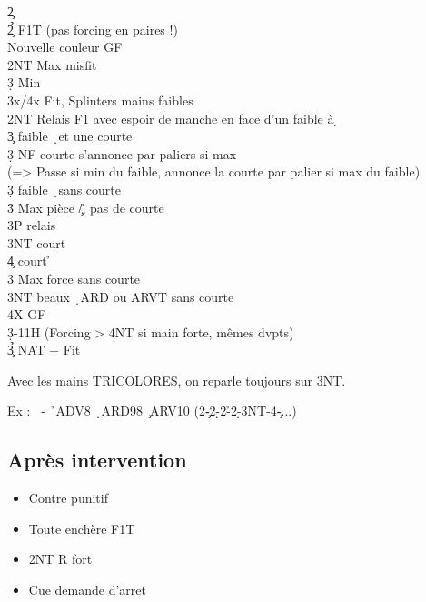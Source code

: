 \documentclass[a4paper]{article}
\begin{document}
\begin{bidtable}
2\c\+\\
2\h{}\c \> F1T (pas forcing en paires !)\\
\>Nouvelle couleur GF\+\\
2NT \> Max misfit\\
3\d \> Min\\
3x/4x \> Fit, Splinters mains faibles\-\\
2NT \> Relais F1 avec espoir de manche en face d’un faible à \d \+\\
3\c \> faible \d\ et une courte\+\\
3\d \> NF courte s’annonce par paliers si max\\
\>(=> Passe si min du faible, annonce la courte par palier si max du faible)\-\\
3\d \> faible \d\ sans courte\\
3\h \> Max pièce \c /\h , pas de courte\+\\
3P \> relais\+\\
3NT \> court \c \\
4\c \> court \h \-\-\\
3\s \> Max force sans courte\\
3NT \> beaux \d\ ARD ou ARVT sans courte\\
4X \> GF\-\\
3\d {}-11H (Forcing > 4NT si main forte, mêmes dvpts)\\
3\h{}\c \> NAT + Fit\-
\end{bidtable}

Avec les mains TRICOLORES, on reparle toujours sur 3NT.

Ex : \s\ - \h\ ADV8 \d\ ARD98 \c\ ARV10
(2\c -2\d -2\h -2\d -3NT-4\c -...)

\subsection{Après intervention}

\begin{itemize}
\item Contre punitif

\item Toute enchère F1T

\item 2NT R fort

\item Cue demande d'arret

\end{itemize}
\end{document}
